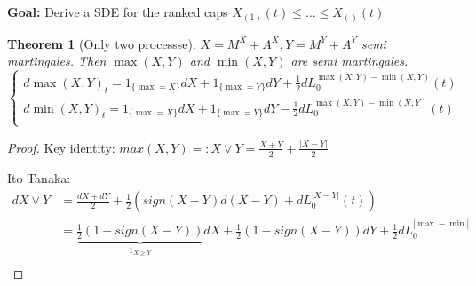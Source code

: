 \documentclass{article} \usepackage[utf8]{inputenc}
\newtheorem{theorem}{Theorem}
\begin{document}
  \textbf{Goal:} Derive a SDE for the ranked caps $X_{(1)}(t) \le \ldots \le X_{()}(t)$

  \begin{theorem}[Only two processse]
    $X = M^X + A^X, Y = M^Y + A^Y$ semi martingales.
    Then $\max(X, Y)$ and $\min(X, Y)$ are semi martingales.
    \[
      \left\{
        \begin{array}{c}
          d \max(X, Y)_t = 1_{\{\max = X\}}  dX + 1_{ \{ \max = Y\} } dY + \frac12 dL_0^{\max(X,Y) - \min(X,Y)}(t)\\
          d \min(X, Y)_t = 1_{\{\max = X\}}  dX + 1_{ \{ \max = Y\} } dY - \frac12 dL_0^{\max(X,Y) - \min(X,Y)}(t)\\
        \end{array}
      \right.
    \]
    
  \end{theorem}
  \begin{proof}
    Key identity: $max(X, Y) =: X \vee Y = \frac{X+Y}2 + \frac{|X-Y|}2$

    Ito Tanaka:
    \begin{align*}
      d X \vee Y &= \frac{dX + dY}2 + \frac12 \left(sign(X-Y) d(X-Y) + dL^{|X-Y|}_0(t) \right)\\
                   &= \underbrace{\frac12(1 + sign(X-Y))}_{1_{X \ge Y}}dX + \frac12(1 - sign(X-Y))dY + \frac12 dL^{|\max-\min|}_0\\
    \end{align*}

  \end{proof}
\end{document}
